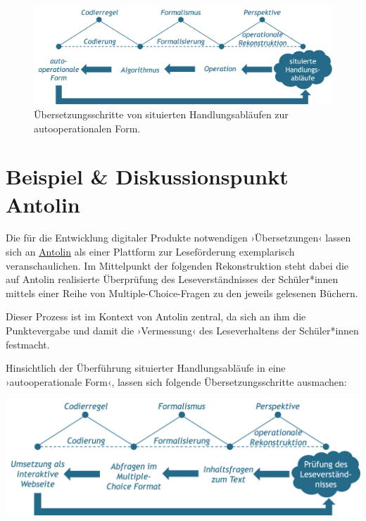 \documentclass[
  a4paper,
]{book}
\begin{document}
\begin{figure}

{\centering \includegraphics{Figures/09-03-autooperationaleForm} 

}

\caption{Übersetzungsschritte von situierten Handlungsabläufen zur autooperationalen Form.}\label{fig:fig14}
\end{figure}

\section{Beispiel \& Diskussionspunkt Antolin}\label{beispiel-diskussionspunkt-antolin}

Die für die Entwicklung digitaler Produkte notwendigen ›Übersetzungen‹ lassen sich an \href{https://antolin.westermann.de/}{Antolin} als einer Plattform zur Leseförderung exemplarisch veranschaulichen. Im Mittelpunkt der folgenden Rekonstruktion steht dabei die auf Antolin realisierte Überprüfung des Leseverständnisses der Schüler*innen mittels einer Reihe von Multiple-Choice-Fragen zu den jeweils gelesenen Büchern.

Dieser Prozess ist im Kontext von Antolin zentral, da sich an ihm die Punktevergabe und damit die ›Vermessung‹ des Leseverhaltens der Schüler*innen festmacht.

Hinsichtlich der Überführung situierter Handlungsabläufe in eine ›autooperationale Form‹, lassen sich folgende Übersetzungsschritte ausmachen:

\begin{center}\includegraphics{Figures/09-04-RekonstruktionAntolin} \end{center}
\end{document}
